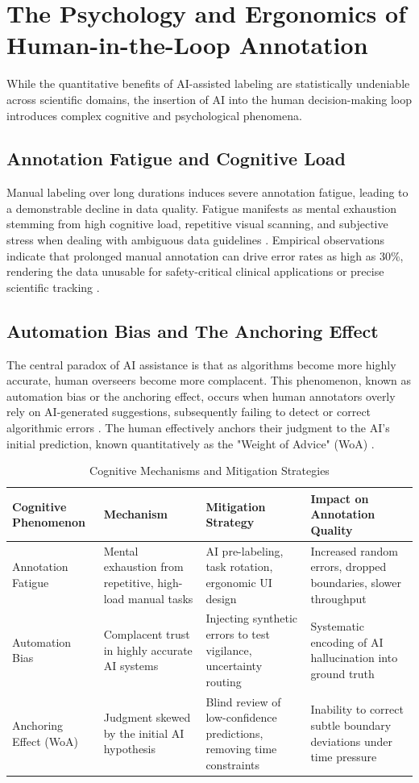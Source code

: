 \documentclass[conference]{IEEEtran}
\begin{document}
\section{The Psychology and Ergonomics of Human-in-the-Loop Annotation}
While the quantitative benefits of AI-assisted labeling are statistically undeniable across scientific domains, the insertion of AI into the human decision-making loop introduces complex cognitive and psychological phenomena.

\subsection{Annotation Fatigue and Cognitive Load}
Manual labeling over long durations induces severe annotation fatigue, leading to a demonstrable decline in data quality. Fatigue manifests as mental exhaustion stemming from high cognitive load, repetitive visual scanning, and subjective stress when dealing with ambiguous data guidelines \cite{ref50}. Empirical observations indicate that prolonged manual annotation can drive error rates as high as 30\%, rendering the data unusable for safety-critical clinical applications or precise scientific tracking \cite{ref52}.

\subsection{Automation Bias and The Anchoring Effect}
The central paradox of AI assistance is that as algorithms become more highly accurate, human overseers become more complacent. This phenomenon, known as automation bias or the anchoring effect, occurs when human annotators overly rely on AI-generated suggestions, subsequently failing to detect or correct algorithmic errors \cite{ref54}. The human effectively anchors their judgment to the AI's initial prediction, known quantitatively as the "Weight of Advice" (WoA) \cite{ref56}.

\begin{table}[ht]
\centering
\caption{Cognitive Mechanisms and Mitigation Strategies}
\label{tab:cognitive}
\renewcommand{\arraystretch}{1.2}
\begin{tabularx}{\linewidth}{@{} l X X X @{}}
\toprule
\textbf{Cognitive Phenomenon} & \textbf{Mechanism} & \textbf{Mitigation Strategy} & \textbf{Impact on Annotation Quality} \\
\midrule
Annotation Fatigue & Mental exhaustion from repetitive, high-load manual tasks & AI pre-labeling, task rotation, ergonomic UI design & Increased random errors, dropped boundaries, slower throughput \\
Automation Bias & Complacent trust in highly accurate AI systems & Injecting synthetic errors to test vigilance, uncertainty routing & Systematic encoding of AI hallucination into ground truth \\
Anchoring Effect (WoA) & Judgment skewed by the initial AI hypothesis & Blind review of low-confidence predictions, removing time constraints & Inability to correct subtle boundary deviations under time pressure \\
\bottomrule
\end{tabularx}
\end{table}
\end{document}
